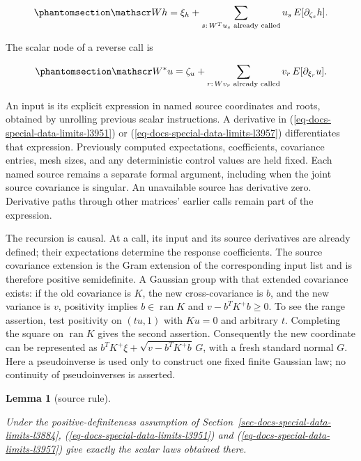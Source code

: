 \documentclass[
  11pt,
]{article}
\theoremstyle{definition}
\theoremstyle{plain}
\theoremstyle{plain}
\theoremstyle{plain}
\newtheorem{lemma}{Lemma}[section]
\theoremstyle{remark}
\begin{document}
\begin{equation}\protect\phantomsection\label{eq-docs-special-data-limits-l3951}{
\mathscr W h=\xi_h+\sum_{s:\,W^Tu_s\text{ already called}}
 u_s\,E[\partial_{\zeta_s}h].
}\end{equation}

The scalar node of a reverse call is

\begin{equation}\protect\phantomsection\label{eq-docs-special-data-limits-l3957}{
\mathscr W^*u=\zeta_u+\sum_{r:\,Wv_r\text{ already called}}
 v_r\,E[\partial_{\xi_r}u].
}\end{equation}

An input is its explicit expression in named source coordinates and
roots, obtained by unrolling previous scalar instructions. A derivative
in (\ref{eq-docs-special-data-limits-l3951}) or
(\ref{eq-docs-special-data-limits-l3957}) differentiates that
expression. Previously computed expectations, coefficients, covariance
entries, mesh sizes, and any deterministic control values are held
fixed. Each named source remains a separate formal argument, including
when the joint source covariance is singular. An unavailable source has
derivative zero. Derivative paths through other matrices' earlier calls
remain part of the expression.

The recursion is causal. At a call, its input and its source derivatives
are already defined; their expectations determine the response
coefficients. The source covariance extension is the Gram extension of
the corresponding input list and is therefore positive semidefinite. A
Gaussian group with that extended covariance exists: if the old
covariance is \(K\), the new cross-covariance is \(b\), and the new
variance is \(v\), positivity implies \(b\in\operatorname{ran}K\) and
\(v-b^TK^+b\ge0\). To see the range assertion, test positivity on
\((tu,1)\) with \(Ku=0\) and arbitrary \(t\). Completing the square on
\(\operatorname{ran}K\) gives the second assertion. Consequently the new
coordinate can be represented as \(b^TK^+\xi+\sqrt{v-b^TK^+b}\,G\), with
a fresh standard normal \(G\). Here a pseudoinverse is used only to
construct one fixed finite Gaussian law; no continuity of pseudoinverses
is asserted.

\begin{lemma}[source
rule]\protect\hypertarget{lem-docs-special-data-limits-l3966}{}\label{lem-docs-special-data-limits-l3966}

Under the positive-definiteness assumption of
Section~\ref{sec-docs-special-data-limits-l3884},
(\ref{eq-docs-special-data-limits-l3951}) and
(\ref{eq-docs-special-data-limits-l3957}) give exactly the scalar laws
obtained there.

\end{lemma}
\end{document}
